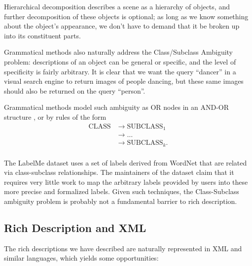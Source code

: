 Hierarchical decomposition describes a scene as a hierarchy of
objects, and further decomposition of these objects is optional; as
long as we know something about the object's appearance, we don't have
to demand that it be broken up into its constituent parts.

\item Grammatical methods also naturally address the Class/Subclass
  Ambiguity problem: descriptions of an object can be general or
  specific, and the level of specificity is fairly arbitrary. It is
  clear that we want the query ``dancer'' in a visual search engine to
  return images of people dancing, but these same images should also
  be returned on the query ``person''. 

  Grammatical methods model such ambiguity as OR nodes in an AND-OR
  structure \cite{zhu-mumford}, or by rules of the form
\begin{align*}
\mathrm{CLASS} &\to \mathrm{SUBCLASS}_1\\
&\to \dots\\
&\to \mathrm{SUBCLASS}_k .\\
\end{align*}

The LabelMe dataset uses a set of labels derived from WordNet
\cite{wordnet} that are related via class-subclass
relationships. The maintainers of the dataset claim that it requires
very little work to map the arbitrary labels provided by users into
these more precise and formalized labels. \cite{labelme} Given
such techniques, the Class-Subclass ambiguity problem is probably not
a fundamental barrier to rich description.

\eitem

\subsection{Rich Description and XML}

The rich descriptions we have described are naturally represented in
XML and similar languages, which yields some opportunities: 

